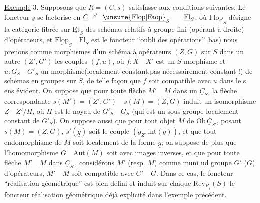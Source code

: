 \uline{Exemple} 3. Supposons que $\underline{R}=(\underline{C},\underline{s})$ satisfasse aux conditions suivantes. Le foncteur $\underline{s}$ se factorise en $\underline{C}\overset{\underline{s}'}{\qquad}\underline{\unsure{\mathrm{Flop}|\mathrm{Faop}}}_S\qquad\underline{\mathrm{Fl}}_S$, où $\underline{\mathrm{Flop}}_S$ désigne la catégorie fibrée sur $\underline{\mathrm{Et}}_S$ des schémas relatifs à groupe fini (opérant à droite) d'opérateurs, et $\underline{\mathrm{Flop}}_S\quad\underline{\mathrm{Fl}}_S$ est le foncteur ``oubli des opérations''.  bas) nous prenons comme morphismes d'un schéma à opérateurs $(Z,G)$ sur $S$ dans un autre $(Z',G')$ les couples $(f,u)$, où $f:X\quad X'$ est un $S$-morphisme et $u:G_S\quad G'_S$ un morphisme(localement constant,\deleted{(}pas nécessairement constant !) de schémas en groupes sur $S$, de telle façon que $f$ soit compatible avec $u$ dans le s ens évident. On suppose que pour toute flèche $M'\quad M$ dans un $\underline{C}_S$,  la flèche correspondante $\underline{s}(M')=(Z',G')\quad\underline{s}(M)=(Z,G)$ induit un isomorphisme $Z\quad Z'/H$, où $H$ est le noyau de $G'_S\quad G_S$ (qui est un sous-groupe localement constant de $G'_S$). On suppose  aussi que pour tout objet $M$ de $\mathrm{Ob}\,\underline{C}_{S'}$, posant $\underline{s}(M)=(Z,G)$,  $\underline{s}'(\underline{g})$ soit le couple $(g_Z,\mathrm{int}(g))$, et que tout  endomorphisme de $M$ soit localement de la forme $\underline{g}$; on  suppose de plus que  l'homomorphisme $G\quad\mathrm{Aut}(M)$ soit  avec images inverses, et que pour toute flèche $M'\quad M$ dans $\underline{C}_{S'}$, considérons $M'$ (resp. $M$) comme muni ud groupe $G'$ ($G$) d'opérateurs, $M'\quad M$ soit compatible avec $G'\quad G$.
Dans ce cas, le foncteur ``réalisation géométrique'' est bien défini et induit sur chaque $\mathrm{Rev}_{\underline{R}_i}(S)$ le foncteur réalisation géométrique déjà explicité dans \hspace{3em} l'exemple précédent.

